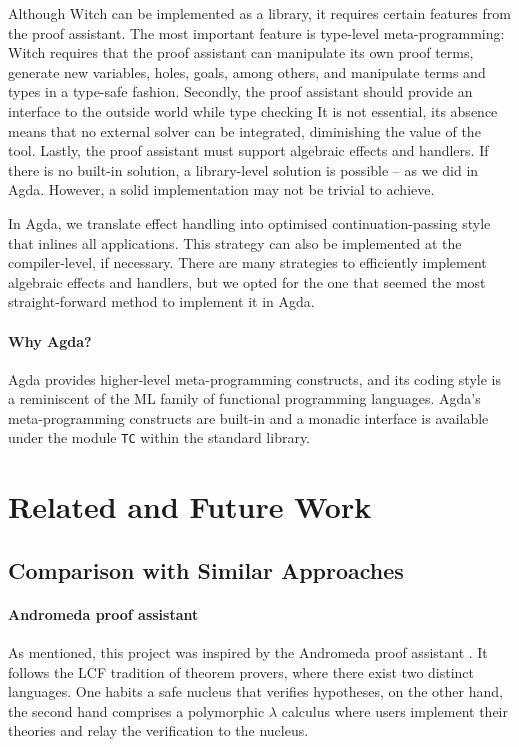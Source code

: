\documentclass[sigconfl]{acmart}
\begin{document}
Although Witch can be implemented as a library, it requires certain features
from the proof assistant. The most important feature is type-level
meta-programming: Witch requires that the proof assistant can manipulate its own
proof terms, generate new variables, holes, goals, among others, and manipulate
terms and types in a type-safe fashion.
Secondly, the proof assistant should provide an interface to the outside world
while type checking
It is not essential, its absence means that no external solver can be
integrated, diminishing the value of the tool.
Lastly, the proof assistant must support algebraic effects and handlers. If there
is no built-in solution, a library-level solution is possible -- as we did in
Agda. However, a solid implementation may not be trivial to achieve.

In Agda,
we translate effect handling into optimised continuation-passing style that inlines
all applications. This strategy can also be implemented at the compiler-level,
if necessary. There are many strategies to efficiently implement algebraic
effects and handlers, but we opted for the one that seemed the most
straight-forward method to implement it in Agda.

\paragraph{Why Agda?} Agda provides higher-level meta-programming constructs, and
its coding style is a reminiscent of the ML family of functional programming
languages. Agda's meta-programming constructs are built-in and a monadic
interface is available under the module \texttt{TC} within the standard library.

\section{Related and Future Work}

\subsection{Comparison with Similar Approaches}

\paragraph{Andromeda proof assistant} As mentioned, this project was inspired by the
Andromeda proof assistant \cite{Bauer2018, DBLP:conf/icms/BauerHP20}. It follows the LCF tradition of theorem provers,
where there exist two distinct languages. One habits a safe nucleus that
verifies hypotheses, on the other hand, the second hand comprises a polymorphic
$\lambda$ calculus where users implement their theories and relay the
verification to the nucleus.
\end{document}

